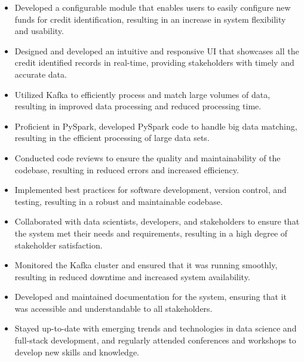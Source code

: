 \documentclass[a4paper]{article}
\begin{document}
\begin{itemize} \itemsep 1pt
\item Developed a configurable module that enables users to easily configure new funds for credit identification, resulting in an increase in system flexibility and usability.
\item Designed and developed an intuitive and responsive UI that showcases all the credit identified records in real-time, providing stakeholders with timely and accurate data.
\item Utilized Kafka to efficiently process and match large volumes of data, resulting in improved data processing and reduced processing time.
\item Proficient in PySpark, developed PySpark code to handle big data matching, resulting in the efficient processing of large data sets.
\item Conducted code reviews to ensure the quality and maintainability of the codebase, resulting in reduced errors and increased efficiency.
\item Implemented best practices for software development, version control, and testing, resulting in a robust and maintainable codebase.
\item Collaborated with data scientists, developers, and stakeholders to ensure that the system met their needs and requirements, resulting in a high degree of stakeholder satisfaction.
\item Monitored the Kafka cluster and ensured that it was running smoothly, resulting in reduced downtime and increased system availability.
\item Developed and maintained documentation for the system, ensuring that it was accessible and understandable to all stakeholders.
\item Stayed up-to-date with emerging trends and technologies in data science and full-stack development, and regularly attended conferences and workshops to develop new skills and knowledge.
\vspace*{2mm}
\end{itemize}
\end{document}
